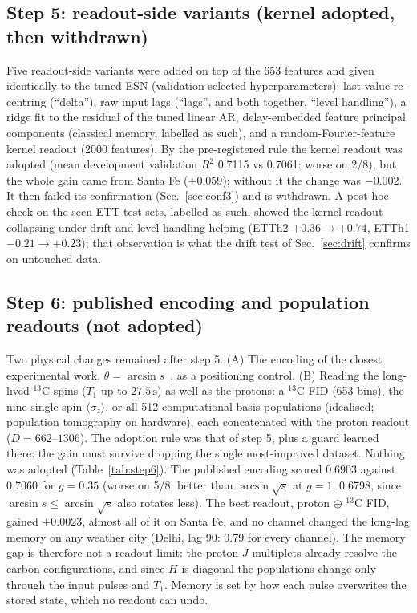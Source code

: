 \documentclass[aps,prresearch,preprint,superscriptaddress,amsmath,amssymb,floatfix]{revtex4-2}
\newcommand{\SI}[2]{\ensuremath{#1\,\mathrm{#2}}}
\begin{document}
\subsection{Step 5: readout-side variants (kernel adopted, then withdrawn)}\label{sec:step5}
Five readout-side variants were added on top of the 653 features and given identically
to the tuned ESN (validation-selected hyperparameters): last-value re-centring
(``delta''), raw input lags (``lags'', and both together, ``level handling''), a ridge
fit to the residual of the tuned linear AR, delay-embedded feature principal
components (classical memory, labelled as such), and a random-Fourier-feature kernel
readout (2000 features). By the pre-registered rule the kernel readout was adopted
(mean development validation $R^2$ 0.7115 vs 0.7061; worse on 2/8), but the whole gain
came from Santa Fe ($+0.059$); without it the change was $-0.002$. It then failed its
confirmation (Sec.~\ref{sec:conf3}) and is withdrawn. A post-hoc check on the seen ETT
test sets, labelled as such, showed the kernel readout collapsing under drift and
level handling helping (ETTh2 $+0.36\to+0.74$, ETTh1 $-0.21\to+0.23$); that
observation is what the drift test of Sec.~\ref{sec:drift} confirms on untouched data.

\subsection{Step 6: published encoding and population readouts (not adopted)}\label{sec:step6}
Two physical changes remained after step 5. (A) The encoding of the closest experimental
work, $\theta=\arcsin s$~\cite{Hou2026}, as a positioning control. (B) Reading the
long-lived $^{13}$C spins ($T_1$ up to \SI{27.5}{s}) as well as the protons: a $^{13}$C
FID (653 bins), the nine single-spin $\langle\sigma_z\rangle$, or all 512
computational-basis populations (idealised; population tomography on hardware), each
concatenated with the proton readout ($D=662$--$1306$). The adoption rule was that of
step 5, plus a guard learned there: the gain must survive dropping the single
most-improved dataset. Nothing was adopted (Table~\ref{tab:step6}). The published
encoding scored 0.6903 against 0.7060 for $g=0.35$ (worse on 5/8; better than
$\arcsin\sqrt{s}$ at $g=1$, 0.6798, since $\arcsin s\le\arcsin\sqrt{s}$ also rotates
less). The best readout, proton $\oplus$ $^{13}$C FID, gained $+0.0023$, almost all of
it on Santa Fe, and no channel changed the long-lag memory on any weather city
(Delhi, lag 90: 0.79 for every channel). The memory gap is therefore not a readout
limit: the proton $J$-multiplets already resolve the carbon configurations, and since
$H$ is diagonal the populations change only through the input pulses and $T_1$.
Memory is set by how each pulse overwrites the stored state, which no readout can
undo.
\end{document}
